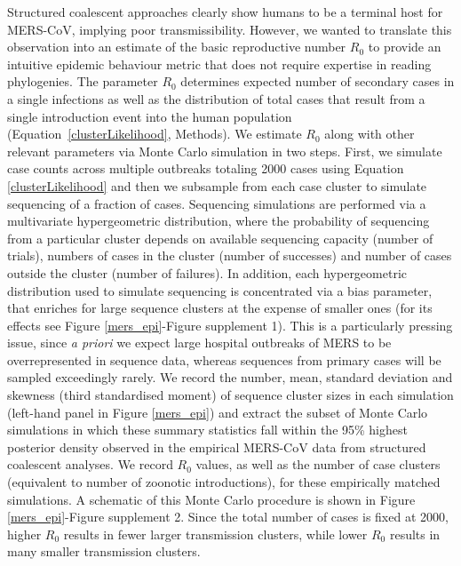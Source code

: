 \documentclass[9pt,lineno]{elife}
\begin{document}
Structured coalescent approaches clearly show humans to be a terminal host for MERS-CoV, implying poor transmissibility.
However, we wanted to translate this observation into an estimate of the basic reproductive number $R_{0}$ to provide an intuitive epidemic behaviour metric that does not require expertise in reading phylogenies.
The parameter $R_{0}$ determines expected number of secondary cases in a single infections as well as the distribution of total cases that result from a single introduction event into the human population (Equation~\ref{clusterLikelihood}, Methods).
We estimate $R_{0}$ along with other relevant parameters via Monte Carlo simulation in two steps.
First, we simulate case counts across multiple outbreaks totaling 2000 cases using Equation \ref{clusterLikelihood} and then we subsample from each case cluster to simulate sequencing of a fraction of cases.
Sequencing simulations are performed via a multivariate hypergeometric distribution, where the probability of sequencing from a particular cluster depends on available sequencing capacity (number of trials), numbers of cases in the cluster (number of successes) and number of cases outside the cluster (number of failures).
In addition, each hypergeometric distribution used to simulate sequencing is concentrated via a bias parameter, that enriches for large sequence clusters at the expense of smaller ones (for its effects see Figure \ref{mers_epi}-Figure supplement 1).
This is a particularly pressing issue, since \textit{a priori} we expect large hospital outbreaks of MERS to be overrepresented in sequence data, whereas sequences from primary cases will be sampled exceedingly rarely.
We record the number, mean, standard deviation and skewness (third standardised moment) of sequence cluster sizes in each simulation (left-hand panel in Figure \ref{mers_epi}) and extract the subset of Monte Carlo simulations in which these summary statistics fall within the 95\% highest posterior density observed in the empirical MERS-CoV data from structured coalescent analyses.
We record $R_{0}$ values, as well as the number of case clusters (equivalent to number of zoonotic introductions), for these empirically matched simulations.
A schematic of this Monte Carlo procedure is shown in Figure \ref{mers_epi}-Figure supplement 2.
Since the total number of cases is fixed at 2000, higher $R_0$ results in fewer larger transmission clusters, while lower $R_0$ results in many smaller transmission clusters.
\end{document}
